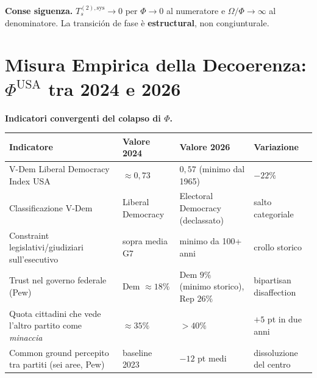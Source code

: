 \Proved{} \textbf{Conse siguenza.} \(T_s^{(2),\text{sys}} \to 0\) per
\(\Phi \to 0\) al numeratore e \(\Omega/\Phi \to \infty\) al
denominatore. La transición de fase è \textbf{estructural}, non
congiunturale.



\section{\texorpdfstring{Misura Empirica della Decoerenza:
\(\Phi^{\text{USA}}\) tra 2024 e
2026}{Misura Empirica della Decoerenza: \textbackslash Phi\^{}\{\textbackslash text\{USA\}\} tra 2024 e 2026}}\label{misura-empirica-della-decoherencia-phitextusa-tra-2024-e-2026}

\Proved{} \textbf{Indicatori convergenti del colapso di \(\Phi\).}

{\def\LTcaptype{none} %
{\small\begin{longtable}[]{@{}
  >{\raggedright\arraybackslash}p{}
  >{\raggedright\arraybackslash}p{}
  >{\raggedright\arraybackslash}p{}
  >{\raggedright\arraybackslash}p{}@{}}
\toprule\noalign{}
\begin{minipage}[b]{\linewidth}\raggedright
Indicatore
\end{minipage} & \begin{minipage}[b]{\linewidth}\raggedright
Valore 2024
\end{minipage} & \begin{minipage}[b]{\linewidth}\raggedright
Valore 2026
\end{minipage} & \begin{minipage}[b]{\linewidth}\raggedright
Variazione
\end{minipage} \\
\midrule\noalign{}
\endhead
\bottomrule\noalign{}
\endlastfoot
V-Dem Liberal Democracy Index USA & \(\approx 0{,}73\) & \(0{,}57\)
(minimo dal 1965) & \(-22\%\) \\
Classificazione V-Dem & Liberal Democracy & Electoral Democracy
(declassato) & salto categoriale \\
Constraint legislativi/giudiziari sull'esecutivo & sopra media G7 &
minimo da 100+ anni & crollo storico \\
Trust nel governo federale (Pew) & Dem \(\approx 18\%\) & Dem \(9\%\)
(minimo storico), Rep \(26\%\) & bipartisan disaffection \\
Quota cittadini che vede l'altro partito come \emph{minaccia} &
\(\approx 35\%\) & \(> 40\%\) & \(+5\) pt in due anni \\
Common ground percepito tra partiti (sei aree, Pew) & baseline 2023 &
\(-12\) pt medi & dissoluzione del centro \\
\end{longtable}}
}

